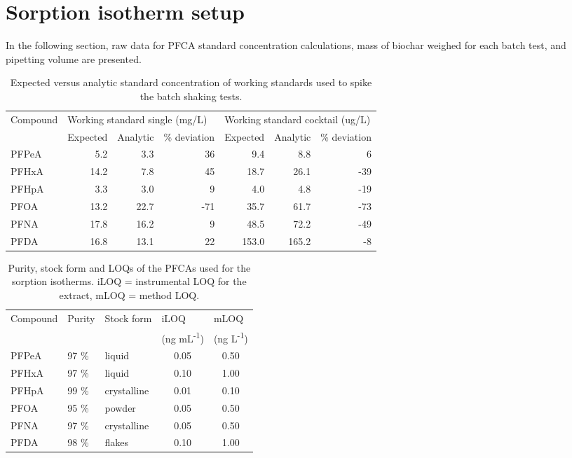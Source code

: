 \chapter{Sorption isotherm setup}\label{appSec:IsothermSetup}
In the following section, raw data for PFCA standard concentration calculations, mass of biochar weighed for each batch test, and pipetting volume are presented.

\begin{table}
\centering
\caption{Expected versus analytic standard concentration of working standards used to spike the batch shaking tests.}
\label{apptab:standards}
\begin{tabular}{lrrrrrr}
\toprule
Compound & \multicolumn{3}{l}{Working standard single (mg/L)} & \multicolumn{3}{l}{Working standard cocktail (ug/L)} \\ \cmidrule(l){2-4} \cmidrule(l){5-7} 
 & Expected & Analytic & \% deviation & Expected & Analytic & \% deviation \\ \midrule
PFPeA & 5.2 & 3.3 & 36 & 9.4 & 8.8 & 6 \\
PFHxA & 14.2 & 7.8 & 45 & 18.7 & 26.1 & -39 \\
PFHpA & 3.3 & 3.0 & 9 & 4.0 & 4.8 & -19 \\
PFOA & 13.2 & 22.7 & -71 & 35.7 & 61.7 & -73 \\
PFNA & 17.8 & 16.2 & 9 & 48.5 & 72.2 & -49 \\
PFDA & 16.8 & 13.1 & 22 & 153.0 & 165.2 & -8 \\ \bottomrule
\end{tabular}
\end{table}

\begin{table}
    \centering
    \caption{Purity, stock form and LOQs of the PFCAs used for the sorption isotherms. iLOQ = instrumental LOQ for  the extract, mLOQ = method LOQ.}
    \label{apptab:LOQ}
    \begin{tabular}{@{}lllcc@{}}
    \toprule
    \multicolumn{1}{l}{Compound}  & \multicolumn{1}{l}{Purity}  & \multicolumn{1}{l}{Stock form} & \multicolumn{1}{l}{iLOQ} & \multicolumn{1}{l}{mLOQ}  \\ 
    & & & \multicolumn{1}{l}{(ng mL\textsuperscript{-1})}  & \multicolumn{1}{l}{(ng L\textsuperscript{-1})} \\ \midrule
     PFPeA  & 97 \%   & liquid      & 0.05 & 0.50   \\
     PFHxA  & 97 \%   & liquid      & 0.10 & 1.00   \\
     PFHpA  & 99 \%   & crystalline & 0.01 & 0.10   \\
     PFOA   & 95 \%   & powder      & 0.05 & 0.50   \\
     PFNA   & 97 \%   & crystalline & 0.05 & 0.50   \\
     PFDA   & 98 \%   & flakes      & 0.10 & 1.00   \\ \bottomrule
    \end{tabular}
\end{table}

